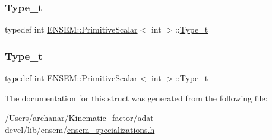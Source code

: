 \mbox{\label{structENSEM_1_1PrimitiveScalar_3_01int_01_4_add9ad08e498afda6942432a1df83407b}} 
\subsubsection{\texorpdfstring{Type\_t}{Type\_t}\hspace{0.1cm}{\footnotesize\ttfamily [2/3]}}
{\footnotesize\ttfamily typedef int \mbox{\hyperlink{structENSEM_1_1PrimitiveScalar}{E\+N\+S\+E\+M\+::\+Primitive\+Scalar}}$<$ int $>$\+::\mbox{\hyperlink{structENSEM_1_1PrimitiveScalar_3_01int_01_4_add9ad08e498afda6942432a1df83407b}{Type\+\_\+t}}}

\mbox{\label{structENSEM_1_1PrimitiveScalar_3_01int_01_4_add9ad08e498afda6942432a1df83407b}} 
\subsubsection{\texorpdfstring{Type\_t}{Type\_t}\hspace{0.1cm}{\footnotesize\ttfamily [3/3]}}
{\footnotesize\ttfamily typedef int \mbox{\hyperlink{structENSEM_1_1PrimitiveScalar}{E\+N\+S\+E\+M\+::\+Primitive\+Scalar}}$<$ int $>$\+::\mbox{\hyperlink{structENSEM_1_1PrimitiveScalar_3_01int_01_4_add9ad08e498afda6942432a1df83407b}{Type\+\_\+t}}}



The documentation for this struct was generated from the following file\+:\begin{DoxyCompactItemize}
\item 
/\+Users/archanar/\+Kinematic\+\_\+factor/adat-\/devel/lib/ensem/\mbox{\hyperlink{adat-devel_2lib_2ensem_2ensem__specializations_8h}{ensem\+\_\+specializations.\+h}}\end{DoxyCompactItemize}

